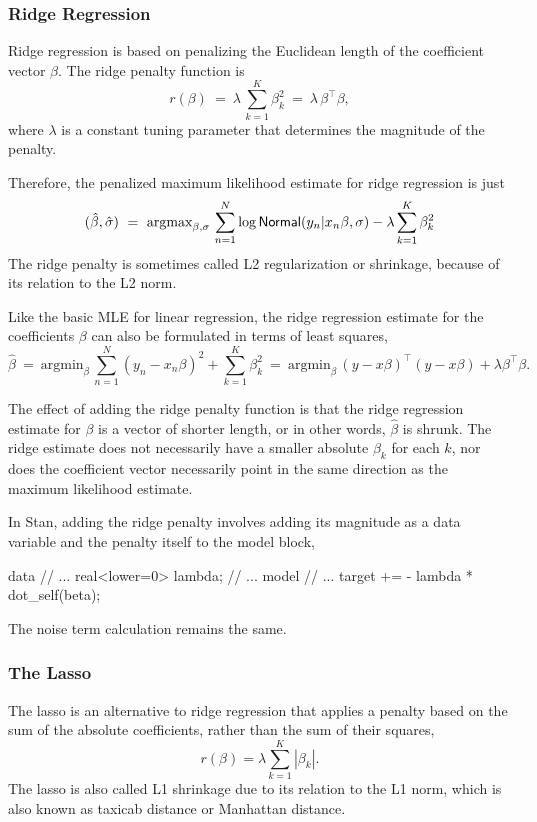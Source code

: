 \subsubsection{Ridge Regression}

Ridge regression \citep{HoerlKennard:1970} is based on penalizing the
Euclidean length of the coefficient vector $\beta$. The ridge penalty
function is
%
\[
r(\beta)
\ = \
\lambda \, \sum_{k=1}^K \beta_k^2
\ = \
\lambda \, \beta^{\top} \beta,
\]
%
where $\lambda$ is a constant tuning parameter that determines the
magnitude of the penalty.


Therefore, the penalized maximum likelihood estimate for ridge
regression is just
%
\[
(\hat{\beta},\hat{\sigma})
\ = \
\mbox{argmax}_{\beta,\sigma} \,
 \sum_{n=1}^N \log \distro{Normal}(y_n|x_n \beta, \sigma) - \lambda
 \sum_{k=1}^K \beta_k^2
\]
%
The ridge penalty is sometimes called L2 regularization or shrinkage,
because of its relation to the L2 norm.

Like the basic MLE for linear regression, the ridge regression
estimate for the coefficients $\beta$ can also be formulated in terms
of least squares,
%
\[
\hat{\beta}
\ = \
\mbox{argmin}_{\beta} \, \sum_{n=1}^N (y_n - x_n \beta)^2 + \sum_{k=1}^K \beta_k^2
\ = \
\mbox{argmin}_{\beta} \, (y - x\beta)^{\top} (y - x\beta) +
\lambda \beta^{\top} \beta.
\]

The effect of adding the ridge penalty function is that the ridge
regression estimate for $\beta$ is a vector of shorter length, or in
other words, $\hat{\beta}$ is shrunk.  The ridge estimate does not
necessarily have a smaller absolute $\beta_k$ for each $k$, nor does
the coefficient vector necessarily point in the same direction as the
maximum likelihood estimate.

In Stan, adding the ridge penalty involves adding its magnitude as a
data variable and the penalty itself to the model block,
%
\begin{stancode}
data {
  // ...
  real<lower=0> lambda;
}
// ...
model {
  // ...
  target += - lambda * dot_self(beta);
}
\end{stancode}
%
The noise term calculation remains the same.

\subsubsection{The Lasso}

The lasso \citep{Tibshirani:1996} is an alternative to ridge
regression that applies a penalty based on the sum of the absolute
coefficients, rather than the sum of their squares,
\[
r(\beta) = \lambda \sum_{k=1}^K | \beta_k |.
\]
The lasso is also called L1 shrinkage due to its relation to the L1
norm, which is also known as taxicab distance or Manhattan distance.

